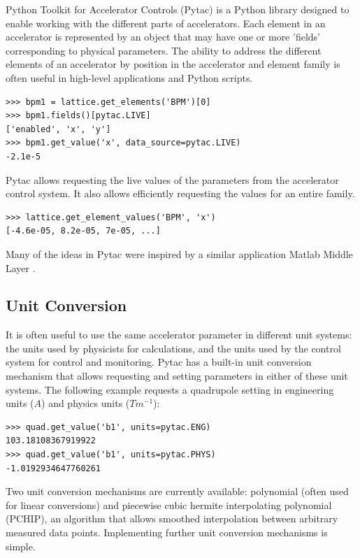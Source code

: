 \documentclass[a4paper,
               keeplastbox,   %
               ]{jacow}
\begin{document}
Python Toolkit for Accelerator Controls (Pytac) is a Python library designed to
enable working with the different parts of accelerators. Each element in an
accelerator is represented by an object that may have one or more 'fields' 
corresponding to physical parameters. The ability to address the different 
elements of an accelerator by position in the accelerator and element family
is often useful in high-level applications and Python scripts.

\begin{lstlisting}
>>> bpm1 = lattice.get_elements('BPM')[0]
>>> bpm1.fields()[pytac.LIVE]
['enabled', 'x', 'y']
>>> bpm1.get_value('x', data_source=pytac.LIVE)
-2.1e-5
\end{lstlisting}

 Pytac allows requesting the live values of the parameters from the accelerator
control system. It also allows efficiently requesting the values for an entire
family.

\begin{lstlisting}
>>> lattice.get_element_values('BPM', 'x')
[-4.6e-05, 8.2e-05, 7e-05, ...]
\end{lstlisting}

Many of the ideas in Pytac were inspired by a similar application Matlab Middle
Layer \cite{mml}.

\subsection{Unit Conversion}

It is often useful to use the same accelerator parameter in different unit systems:
the units used by physicists for calculations, and the units used by the control
system for control and monitoring. Pytac has a built-in unit conversion mechanism
that allows requesting and setting parameters in either of these unit systems. The
following example requests a quadrupole setting in engineering units ($A$) and
physics units ($Tm^{-1}$):

\begin{lstlisting}
>>> quad.get_value('b1', units=pytac.ENG)
103.18108367919922
>>> quad.get_value('b1', units=pytac.PHYS)
-1.0192934647760261
\end{lstlisting}

Two unit conversion mechanisms are currently available: polynomial (often used for 
linear conversions) and piecewise cubic hermite interpolating polynomial (PCHIP),
an algorithm that allows smoothed interpolation between arbitrary measured data
points. Implementing further unit conversion mechanisms is simple.
\end{document}
